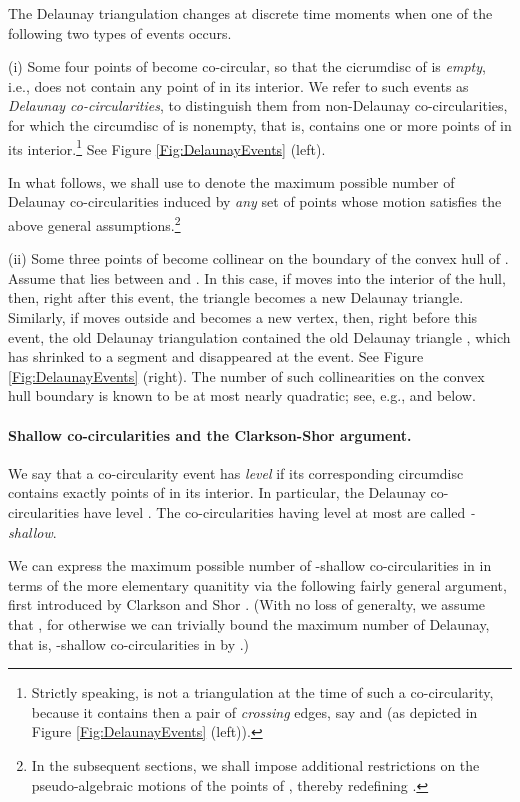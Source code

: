 \documentclass[letter,11pt]{article}
\begin{document}
The Delaunay triangulation  changes at discrete time moments  when one of the following two types of events occurs.

(i) Some four points   of  become co-circular, so that the cicrumdisc of  is {\it empty}, i.e., does not contain any point of  in its interior. We refer to such events as {\it Delaunay co-circularities}, to distinguish them from non-Delaunay co-circularities, for which the circumdisc of  is nonempty, that is, contains one or more points of  in its interior.\footnote{Strictly speaking,  is not a triangulation at the time  of such a co-circularity, because it contains then a pair of {\it crossing} edges, say  and  (as depicted in Figure \ref{Fig:DelaunayEvents} (left)).} See Figure \ref{Fig:DelaunayEvents} (left).


In what follows, we shall use  to denote the maximum possible number of Delaunay co-circularities induced by {\it any} set  of  points whose motion satisfies the above general assumptions.\footnote{In the subsequent sections, we shall impose additional restrictions on the pseudo-algebraic motions of the points of , thereby  redefining .}

(ii) Some three points  of  become collinear on the boundary of the convex hull of . Assume that  lies between  and . In this case, if  moves into the interior of the hull, then, right after this event, the triangle  becomes a new Delaunay triangle. Similarly, if  moves outside and becomes a new vertex, then, right before this event, the old Delaunay triangulation  contained the old Delaunay triangle , which has shrinked to a segment and disappeared at the event. See Figure \ref{Fig:DelaunayEvents} (right).
The number of such collinearities on the convex hull boundary is known to be at most nearly quadratic; see, e.g., \cite[Section 8.6.1]{SA95} and below.




\paragraph{Shallow co-circularities and the Clarkson-Shor argument.}
We say that a co-circularity event has {\it level}  if its corresponding circumdisc contains exactly  points of  in its interior. In particular, the Delaunay co-circularities have level . The co-circularities having level at most  are called {\it -shallow}.

We can express the maximum possible number of -shallow co-circularities in  in terms of the more elementary quanitity  via the following fairly general argument, first introduced by Clarkson and Shor \cite{CS}.
(With no loss of generalty, we assume that , for otherwise we can trivially bound the maximum number of Delaunay, that is, -shallow co-circularities in  by .)
\end{document}

